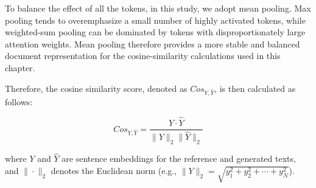







 
To balance the effect of all the tokens, in this study, we adopt mean pooling. Max pooling tends to overemphasize a small number of highly activated tokens, while weighted-sum pooling can be dominated by tokens with disproportionately large attention weights. Mean pooling therefore provides a more stable and balanced document representation for the cosine-similarity calculations used in this chapter. 


Therefore, the cosine similarity score, denoted as $Cos_{Y, \hat{Y}}$, is then calculated as follows:


\begin{equation*}
    Cos_{Y, \hat{Y}} = \frac{Y \cdot \hat{Y}}{\|Y\|_2 \|\hat{Y}\|_2}
\end{equation*}


where $Y$ and $\hat{Y}$ are sentence embeddings for the reference and generated texts, and $\|\cdot\|_2$ denotes the Euclidean norm (e.g., $\|Y\|_2=\sqrt{y_1^2+y_2^2+\cdots+y_N^2}$).


